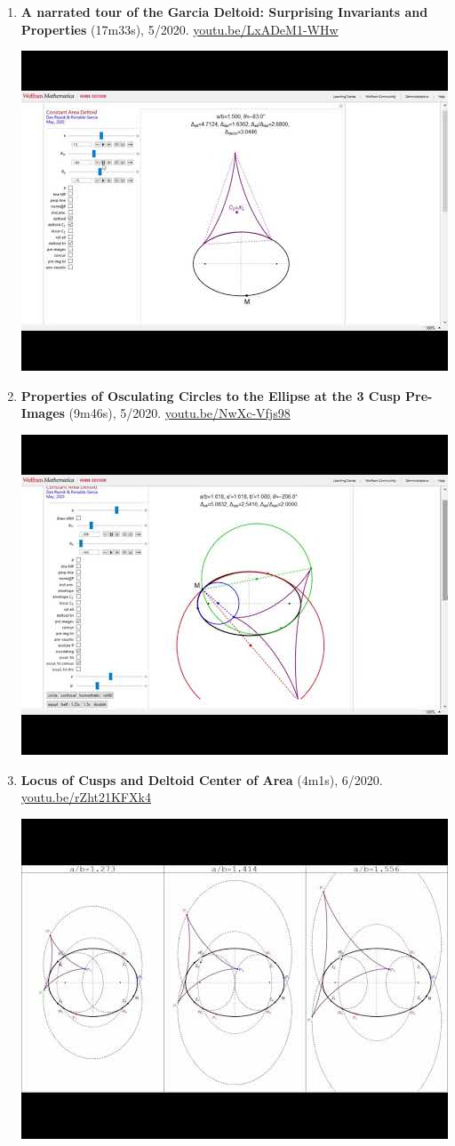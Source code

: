 \documentclass[12pt]{article}
\begin{document}
\begin{enumerate}[resume]
% 
\item \textbf{A narrated tour of the Garcia Deltoid: Surprising Invariants and Properties} (17m33s), 5/2020. \href{https://youtu.be/LxADeM1-WHw}{\url{youtu.be/LxADeM1-WHw}}
\begin{center}\includegraphics[width=.5\textwidth]{pics/LxADeM1-WHw.jpg}\end{center}
% 
\item \textbf{Properties of Osculating Circles to the Ellipse at the 3 Cusp Pre-Images} (9m46s), 5/2020. \href{https://youtu.be/NwXc-Vfjs98}{\url{youtu.be/NwXc-Vfjs98}}
\begin{center}\includegraphics[width=.5\textwidth]{pics/NwXc-Vfjs98.jpg}\end{center}
% 
\item \textbf{Locus of Cusps and Deltoid Center of Area} (4m1s), 6/2020. \href{https://youtu.be/rZht21KFXk4}{\url{youtu.be/rZht21KFXk4}}
\begin{center}\includegraphics[width=.5\textwidth]{pics/rZht21KFXk4.jpg}\end{center}

\end{enumerate}
\end{document}
